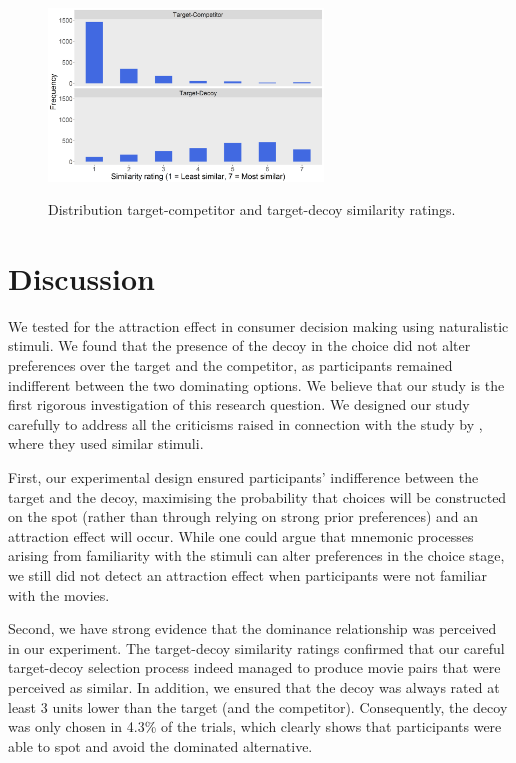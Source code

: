 \documentclass[12pt, a4paper]{article}
\begin{document}
\begin{figure}[htb!]
\centering
\captionsetup{justification=centering}
\caption{Distribution target-competitor and target-decoy similarity ratings.}
\includegraphics[width=0.65\textwidth]{exp2_similarityratings.png}
\label{fig:exp2_similarityratings}
\end{figure}

\section{Discussion}

We tested for the attraction effect in consumer decision making using naturalistic stimuli. We found that the presence of the decoy in the choice did not alter preferences over the target and the competitor, as participants remained indifferent between the two dominating options. We believe that our study is the first rigorous investigation of this research question. We designed our study carefully to address all the criticisms raised in connection with the study by \citeauthor{Frederick2014}, where they used similar stimuli.

First, our experimental design ensured participants' indifference between the target and the decoy, maximising the probability that choices will be constructed on the spot (rather than through relying on strong prior preferences) and an attraction effect will occur. While one could argue that mnemonic processes arising from familiarity with the stimuli can alter preferences in the choice stage, we still did not detect an attraction effect when participants were not familiar with the movies. 

Second, we have strong evidence that the dominance relationship was perceived in our experiment. The target-decoy similarity ratings confirmed that our careful target-decoy selection process indeed managed to produce movie pairs that were perceived as similar. In addition, we ensured that the decoy was always rated at least 3 units lower than the target (and the competitor). Consequently, the decoy was only chosen in 4.3\% of the trials, which clearly shows that participants were able to spot and avoid the dominated alternative.
\end{document}
